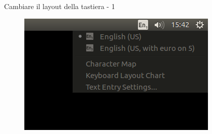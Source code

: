 \begin{frame}{Cambiare il layout della tastiera - 1}

\begin{figure}
\centering
\includegraphics[scale=0.8]{res/img/1}
\end{figure}

\end{frame}